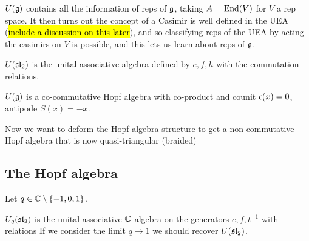 \documentclass{article}
\begin{document}
\begin{idea}
$U(\mathfrak{g})$ contains all the information of reps of $\mathfrak{g}$, taking $A = \operatorname{End}(V)$ for $V$ a rep space. It then turns out the concept of a Casimir is well defined in the UEA (\hl{include a discussion on this later}), and so classifying reps of the UEA by acting the casimirs on $V$ is possible, and this lets us learn about reps of $\mathfrak{g}$. 
\end{idea}

\begin{example}
$U(\mathfrak{sl}_2)$ is the unital associative algebra  defined by $e,f,h$ with the commutation relations. 
\end{example}

\begin{prop}
$U(\mathfrak{g})$ is a co-commutative Hopf algebra with co-product 
and counit $\epsilon(x) = 0$, antipode $S(x) = -x$.
\end{prop}

Now we want to deform the Hopf algebra structure to get a non-commutative Hopf algebra that is now quasi-triangular (braided) 

\subsection{The Hopf algebra }

Let $q \in \mathbb{C}\setminus \left\{ -1,0,1 \right\}$. 

\begin{definition}
$U_q(\mathfrak{sl}_2)$ is the unital associative $\mathbb{C}$-algebra
on the generators $e,f, t^{\pm 1}$ with relations 
If we consider the limit $q \to 1$ we should recover $U(\mathfrak{sl}_2)$.
\end{definition}
\end{document}
